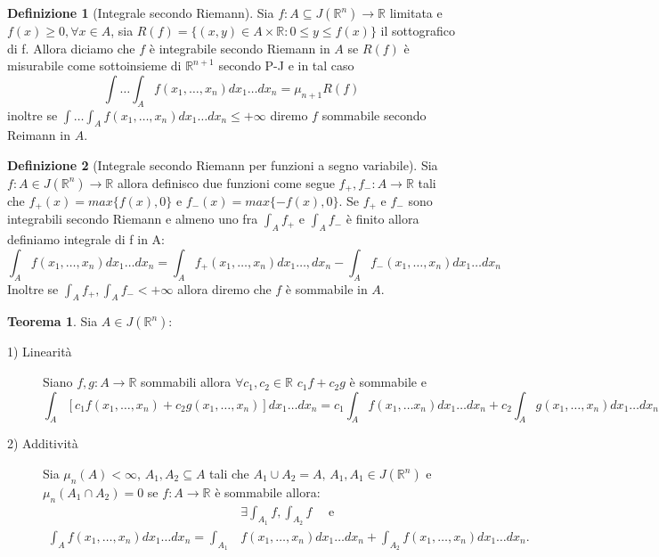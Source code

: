 \documentclass[leqno]{article}
\theoremstyle{definition}
\newtheorem{definition}{Definizione}[section]
\numberwithin{equation}{section}
\newtheorem{theorem}{Teorema}[section]
\theoremstyle{remark}
\begin{document}
	\begin{definition}[Integrale secondo Riemann]
		Sia $f:A\subseteq J(\mathbb{R}^n) \rightarrow \mathbb{R}$ limitata e $f(x)\ge 0, \forall x\in A$, sia $R(f)=\{(x,y)\in A\times \mathbb{R}: 0 \le y \le f(x)\} $ il sottografico di f. Allora diciamo che $f$ è integrabile secondo Riemann in $A$ se $R(f)$ è misurabile come sottoinsieme di $\mathbb{R}^{n+1}$ secondo P-J e in tal caso 
		\begin{equation}
			\int \dots \int_A f(x_1,\dots ,x_n)dx_1\dots dx_n=\mu_{n+1}R(f)
		\end{equation}
		inoltre se $\int \dots \int_A f(x_1,\dots ,x_n)dx_1\dots dx_n\le + \infty$ diremo $f$ sommabile secondo Reimann in $A$.
	\end{definition}
	\begin{definition}[Integrale secondo Riemann per funzioni a segno variabile]
		Sia $f:A\in J(\mathbb{R}^n) \rightarrow \mathbb{R}$ allora definisco due funzioni come segue $f_+,f_-:A\rightarrow \mathbb{R}$ tali che $f_+(x)=max\{f(x),0\}$ e $f_-(x)=max\{-f(x),0\}$. Se $f_+$ e $f_-$ sono integrabili secondo Riemann e almeno uno fra $\int_A f_+$ e $\int_A f_-$ è finito allora definiamo integrale di f in A:
		\begin{equation}
			\int_Af(x_1,\dots , x_n)dx_1\dots dx_n=\int_Af_+(x_1,\dots ,x_n)dx_1\dots , dx_n-\int_Af_-(x_1,\dots ,x_n)dx_1\dots dx_n
		\end{equation}
		Inoltre se $\int_A f_+,\int_A f_-<+\infty$ allora diremo che $f$ è sommabile in $A$.
	\end{definition}
	\begin{theorem}
		Sia $A\in J(\mathbb{R}^n)$:
		\begin{description}
			\item[1) Linearità] Siano $f,g:A\to \mathbb{R}$ sommabili allora $\forall c_1,c_2 \in \mathbb{R}$ $c_1f+c_2g$ è sommabile e 
			\begin{equation}
				\int_A[c_1f(x_1,\dots ,x_n)+c_2g(x_1,\dots ,x_n)]dx_1\dots dx_n= c_1\int_Af(x_1, \dots x_n)dx_1 \dots dx_n+c_2\int_Ag(x_1,\dots ,x_n)dx_1 \dots dx_n
			\end{equation}   
			\item[2) Additività] Sia $\mu_n(A)<\infty$, $A_1,A_2\subseteq A$ tali che $A_1\cup A_2=A, \, A_1,A_1\in J(\mathbb{R}^n)$ e $\mu_n(A_1\cap A_2)=0$ se $f:A\to \mathbb{R}$ è sommabile allora: 
			\begin{align*}
				&\exists \int_{A_1}f, \int_{A_2}f \quad \text{ e}\\
				\int_Af(x_1,\dots ,x_n)dx_1\dots dx_n=\int_{A_1} &f(x_1,\dots ,x_n)dx_1\dots dx_n+\int_{A_2}f(x_1,\dots ,x_n)dx_1\dots dx_n.
			\end{align*}
		\end{description}
	\end{theorem}
\end{document}
